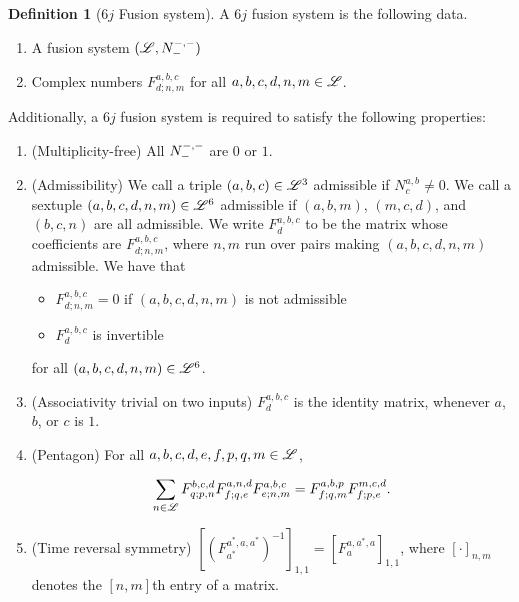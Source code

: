 \documentclass{article}
\theoremstyle{definition}
\newtheorem*{definition}{Definition}
\numberwithin{figure}{section}
\begin{document}
\begin{definition}[$6j$ Fusion system] A $6j$ fusion system is the following data.

\begin{enumerate}
\item A fusion system $(\mathscr{L}, N_{\--}^{\--,\--})$
\item Complex numbers $F^{a,b,c}_{d;n,m}$ for all $a,b,c,d,n,m\in \mathscr{L}$.
\end{enumerate} 

Additionally, a $6j$ fusion system is required to satisfy the following properties:

\begin{enumerate}

\item (Multiplicity-free) All $N^{\--,\--}_{\--}$ are $0$ or $1$.

\item (Admissibility) We call a triple $(a,b,c)\in \mathscr{L}^3$ admissible if $N^{a,b}_c\neq 0$. We call a sextuple $(a,b,c,d,n,m)\in \mathscr{L}^6$ admissible if $(a,b,m)$, $(m,c,d)$, and $(b,c,n)$ are all admissible. We write $F^{a,b,c}_{d}$ to be the matrix whose coefficients are $F^{a,b,c}_{d;n,m}$, where $n,m$ run over pairs making $(a,b,c,d,n,m)$ admissible. We have that
\begin{itemize}
\item $F^{a,b,c}_{d;n,m}=0$ if $(a,b,c,d,n,m)$ is not admissible
\item $F^{a,b,c}_{d}$ is invertible
\end{itemize}

for all $(a,b,c,d,n,m)\in \mathscr{L}^6$.

\item (Associativity trivial on two inputs) $F^{a,b,c}_{d}$ is the identity matrix, whenever $a$, $b$, or $c$ is $1$.

\item (Pentagon) For all $a,b,c,d,e,f,p,q,m\in\mathscr{L}$,

$$\sum_{n\in \mathscr{L}}F^{b,c,d}_{q;p,n}F^{a,n,d}_{f;q,e}F^{a,b,c}_{e;n,m}=F^{a,b,p}_{f; q,m}F^{m,c,d}_{f;p,e}.$$

\item (Time reversal symmetry) $\left[\left(F^{a^*,a,a^*}_{a^*}\right)^{-1}\right]_{1,1}=\left[F^{a,a^*,a}_{a}\right]_{1,1}$, where $\left[\cdot\right]_{n,m}$ denotes the $[n,m]$th entry of a matrix.
\end{enumerate}
\raggedleft\qedsymbol{}
\end{definition}
\end{document}
